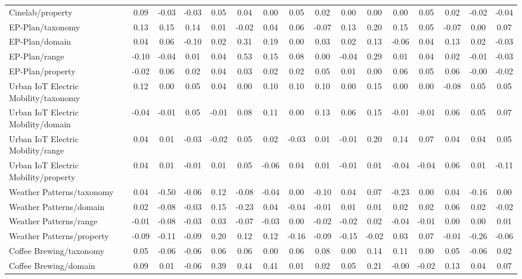\begin{tabular}{lccccccccccccccc}
Cinelab/property & 0.09 & -0.03 & -0.03 & 0.05 & 0.04 & 0.00 & 0.05 & 0.02 & 0.00 & 0.00 & 0.00 & 0.05 & 0.02 & -0.02 & -0.04 \\
EP-Plan/taxonomy & 0.13 & 0.15 & 0.14 & 0.01 & -0.02 & 0.04 & 0.06 & -0.07 & 0.13 & 0.20 & 0.15 & 0.05 & -0.07 & 0.00 & 0.07 \\
EP-Plan/domain & 0.04 & 0.06 & -0.10 & 0.02 & 0.31 & 0.19 & 0.00 & 0.03 & 0.02 & 0.13 & -0.06 & 0.04 & 0.13 & 0.02 & -0.03 \\
EP-Plan/range & -0.10 & -0.04 & 0.01 & 0.04 & 0.53 & 0.15 & 0.08 & 0.00 & -0.04 & 0.29 & 0.01 & 0.04 & 0.02 & -0.01 & -0.03 \\
EP-Plan/property & -0.02 & 0.06 & 0.02 & 0.04 & 0.03 & 0.02 & 0.02 & 0.05 & 0.01 & 0.00 & 0.06 & 0.05 & 0.06 & -0.00 & -0.02 \\
Urban IoT Electric Mobility/taxonomy & 0.12 & 0.00 & 0.05 & 0.04 & 0.00 & 0.10 & 0.10 & 0.10 & 0.00 & 0.15 & 0.00 & 0.00 & -0.08 & 0.05 & 0.05 \\
Urban IoT Electric Mobility/domain & -0.04 & -0.01 & 0.05 & -0.01 & 0.08 & 0.11 & 0.00 & 0.13 & 0.06 & 0.15 & -0.01 & -0.01 & 0.06 & 0.05 & 0.07 \\
Urban IoT Electric Mobility/range & 0.04 & 0.01 & -0.03 & -0.02 & 0.05 & 0.02 & -0.03 & 0.01 & -0.01 & 0.20 & 0.14 & 0.07 & 0.04 & 0.04 & 0.05 \\
Urban IoT Electric Mobility/property & 0.04 & 0.01 & -0.01 & 0.01 & 0.05 & -0.06 & 0.04 & 0.01 & -0.01 & 0.01 & -0.04 & -0.04 & 0.06 & 0.01 & -0.11 \\
Weather Patterns/taxonomy & 0.04 & -0.50 & -0.06 & 0.12 & -0.08 & -0.04 & 0.00 & -0.10 & 0.04 & 0.07 & -0.23 & 0.00 & 0.04 & -0.16 & 0.00 \\
Weather Patterns/domain & 0.02 & -0.08 & -0.03 & 0.15 & -0.23 & 0.04 & -0.04 & -0.01 & 0.01 & 0.01 & 0.02 & 0.02 & 0.06 & 0.02 & -0.02 \\
Weather Patterns/range & -0.01 & -0.08 & -0.03 & 0.03 & -0.07 & -0.03 & 0.00 & -0.02 & -0.02 & 0.02 & -0.04 & -0.01 & 0.00 & 0.00 & 0.01 \\
Weather Patterns/property & -0.09 & -0.11 & -0.09 & 0.20 & 0.12 & 0.12 & -0.16 & -0.09 & -0.15 & -0.02 & 0.03 & 0.07 & -0.01 & -0.26 & -0.06 \\
Coffee Brewing/taxonomy & 0.05 & -0.06 & -0.06 & 0.06 & 0.06 & 0.00 & 0.06 & 0.08 & 0.00 & 0.14 & 0.11 & 0.00 & 0.05 & -0.06 & 0.02 \\
Coffee Brewing/domain & 0.09 & 0.01 & -0.06 & 0.39 & 0.44 & 0.41 & 0.01 & 0.02 & 0.05 & 0.21 & -0.00 & -0.02 & 0.13 & 0.04 & 0.07 \\

\end{tabular}
